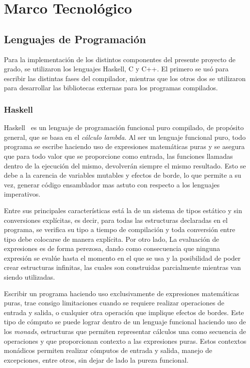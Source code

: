 \chapter{Marco Tecnológico}
\label{capitulo2}



\section{Lenguajes de Programación}

Para la implementación de los distintos componentes del presente proyecto de
grado, se utilizaron los lenguajes Haskell, C y C++. El primero se usó para
escribir las distintas fases del compilador, mientras que los otros dos se
utilizaron para desarrollar las bibliotecas externas para los programas
compilados.

\subsection{Haskell}
Haskell~\cite{haskell} es un lenguaje de programación funcional puro compilado, de propósito
general, que se basa en el \textit{cálculo lambda}. Al ser un lenguaje
funcional puro, todo programa se escribe haciendo uso de expresiones
matemáticas puras y se asegura que para todo valor que se proporcione como
entrada, las funciones llamadas dentro de la ejecución del mismo, devolverán
siempre el mismo resultado. Esto se debe a la carencia de variables mutables y
efectos de borde, lo que permite a su vez, generar código ensamblador mas
astuto con respecto a los lenguajes imperativos.

Entre sus principales características está la de un sistema de tipos estático y
sin conversiones explícitas, es decir, para todas las estructuras declaradas en
el programa, se verifica su tipo a tiempo de compilación y toda conversión entre
tipo debe colocarse de manera explícita. Por otro lado, La evaluación de
expresiones es de forma perezosa, dando como consecuencia que ninguna expresión
se evalúe hasta el momento en el que se usa y la posibilidad de poder crear
estructuras infinitas, las cuales son construidas parcialmente mientras van
siendo utilizadas.

Escribir un programa haciendo uso exclusivamente de expresiones matemáticas
puras, trae consigo limitaciones cuando se requiere realizar operaciones de
entrada y salida, o cualquier otra operación que implique efectos de bordes.
Este tipo de cómputo se puede lograr dentro de un lenguaje funcional haciendo
uso de los \textit{monads}, estructuras que permiten representar cálculos una
como secuencia de operaciones y que proporcionan contexto a las expresiones
puras. Estos contextos monádicos permiten realizar cómputos de entrada y
salida, manejo de excepciones, entre otros, sin dejar de lado la pureza
funcional.

